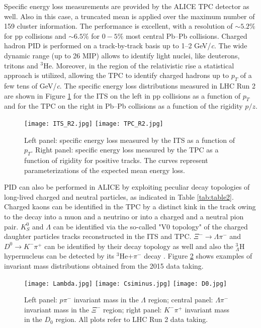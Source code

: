\documentclass[10pt]{article}
\begin{document}
Specific energy loss measurements are provided by the ALICE TPC detector as well. Also in this case, a truncated mean is applied over the maximum number of 159 cluster information. The performance is excellent, with a resolution of $\sim 5.2 \%$ for pp collisions and $\sim 6.5 \%$ for $0-5 \%$ most central Pb--Pb collisions. Charged hadron PID is performed on a track-by-track basis up to 1--2 GeV/{\it c}. The wide dynamic range (up to 26 MIP) allows to identify light nuclei, like deuterons, tritons and $^{3}$He. Moreover, in the region of the relativistic rise a statistical approach is utilized, allowing the TPC to identify charged hadrons up to $p_{T}$ of a few tens of GeV/{\it c}.
The specific energy loss distributions measured in LHC Run 2 are shown in Figure \ref{fig:fig2} for the ITS on the left in pp collisions as a function of $p_{T}$ and for the TPC on the right in Pb--Pb collisions as a function of the rigidity $p/z$. 
\begin{figure}[htb]
\vspace{-4mm}
\centering
\texttt{[image: ITS\_R2.jpg]}
\hspace{2mm}
\texttt{[image: TPC\_R2.jpg]}
\caption{Left panel: specific energy loss measured by the ITS as a function of $p_{T}$. Right panel: specific energy loss measured by the TPC as a function of rigidity for positive tracks. The curves represent parameterizations of the expected mean energy loss.}
\label{fig:fig2}
\end{figure}

PID can also be performed in ALICE by exploiting peculiar decay topologies of long-lived charged and neutral particles, as indicated in Table \ref{tab:table2}. 
Charged kaons can be identified in the TPC by a distinct kink in the track owing to the decay into a muon and a neutrino or into a charged and a neutral pion pair. $K^{0}_{S}$ and $\Lambda$ can be identified via the so-called "V0 topology" of the charged daughter particles tracks reconstructed in the ITS and TPC. $\Xi^{-}\rightarrow \Lambda \pi^{-}$ and $D^{0}\rightarrow K^{-} \pi^{+}$ can be identified by their decay topology as well and also the $^{3}_{\Lambda}$H hypernucleus can be detected by its $^{3}$He+$\pi^{-}$ decay \cite{ref:3LH}. Figure \ref{fig:fig3} shows examples of  invariant mass distributions obtained from the 2015 data taking. 
\begin{figure}[h]
\vspace{-1mm}
\centering
\texttt{[image: Lambda.jpg]}
\hspace{2mm}
\texttt{[image: Csiminus.jpg]}
\hspace{2mm}
\texttt{[image: D0.jpg]}
\caption{Left panel: $p \pi^{-}$ invariant mass in the $\Lambda$ region; central panel: $\Lambda \pi^{-}$ invariant mass in the $\Xi^{-}$ region; right panel: $K^{-} \pi^{+}$ invariant mass in the $D_{0}$ region. All plots refer to LHC Run 2 data taking.}
\label{fig:fig3}
\end{figure}
\end{document}
